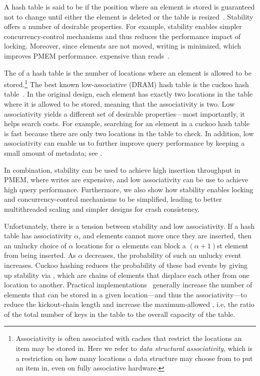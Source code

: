 A hash table is said to be  if the position where an element is
stored is guaranteed not to change until either the element is deleted or the
table is resized~\cite{sandersstability,originalstability,KnuthVol3}.
Stability offers a number of desirable properties.  For example, stability
enables simpler concurrency-control mechanisms and thus reduces the performance
impact of locking.  Moreover, since elements are not moved, writing is
minimized, which improves PMEM performance.
expensive than reads~\cite{pmem-measurements}.

The  of a hash table is the number of locations where an
element is allowed to be stored.\footnote{Associativity is often associated with
caches that restrict the locations an item may be stored in.  Here we refer to
\emph{data structural associativity}, which is a restriction on how many
locations a data structure may choose from to put an item in, even on fully
associative hardware.} The best known low-associative (DRAM) hash table is the
cuckoo hash table~\cite{Pagh:CuckooHash,PaghRo01}.  In the original design, each
element has exactly two locations in the table where it is allowed to be stored,
meaning that the associativity is two.  Low associativity yields a different set
of desirable properties---most importantly, it helps search costs. For example,
searching for an element in a cuckoo hash table is fast because there are only
two locations in the table to check.  In addition, low associativity can enable
us to further improve query performance by keeping a small amount of metadata;
see .


In combination, stability can be used to achieve high insertion throughput in
PMEM, where writes are expensive, and low associativity can be use to achieve
high query  performance.  Furthermore, we also show how stability enables
locking and concurrency-control mechanisms to be simplified, leading to better
multithreaded scaling and simpler designs for crash consistency.

Unfortunately, there is a tension between stability and low associativity.  If a
hash table has associativity $\alpha$, and elements cannot move once they are
inserted, then an unlucky choice of $\alpha$ locations for $\alpha$ elements can
block a $(\alpha+1)$st element from being inserted.  As $\alpha$ decreases, the
probability of such an unlucky event increases.  Cuckoo hashing reduces the
probability of these bad events by giving up stability via , which are chains of elements that displace each other from one location
to another. Practical implementations~\cite{LiAn14} generally increase the
number of elements that can be stored in a given location---and thus the
associativity---to reduce the kickout-chain length and increase the
maximum-allowed , i.e, the ratio of the total number of keys
in the table to the overall capacity of the table.


